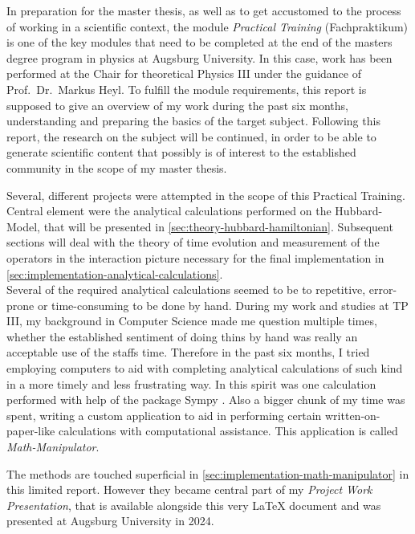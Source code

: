 In preparation for the master thesis, as well as to get accustomed to the process of working in a scientific context, the module \emph{Practical Training} (\glqq Fachpraktikum\grqq{}) is one of the key modules that need to be completed at the end of the masters degree program in physics at Augsburg University.
In this case, work has been performed at the Chair for theoretical Physics III under the guidance of  Prof.~Dr.~Markus Heyl.
To fulfill the module requirements, this report is supposed to give an overview of my work during the past six months, understanding and preparing the basics of the target subject.
Following this report, the research on the subject will be continued, in order to be able to generate scientific content that possibly is of interest to the established community in the scope of my master thesis.

Several, different projects were attempted in the scope of this Practical Training. 
Central element were the analytical calculations performed on the Hubbard-Model, that will be presented in \autoref{sec:theory-hubbard-hamiltonian}.
Subsequent sections will deal with the theory of time evolution and measurement of the operators in the interaction picture necessary for the final implementation in \autoref{sec:implementation-analytical-calculations}.\\

Several of the required analytical calculations seemed to be to repetitive, error-prone or time-consuming to be done by hand. 
During my work and studies at TP III, my background in Computer Science made me question multiple times, whether the established sentiment of doing thins \glqq by hand\grqq{} was really an acceptable use of the staffs time.
Therefore in the past six months, I tried employing computers to aid with completing analytical calculations of such kind in a more timely and less frustrating way.
In this spirit was one calculation performed with help of the package Sympy \cite{sympyPackage}.
Also a bigger chunk of my time was spent, writing a custom application to aid in performing certain \glqq written-on-paper-like\grqq{} calculations with computational assistance. This application is called \emph{Math-Manipulator}.

The methods are touched superficial in \autoref{sec:implementation-math-manipulator} in this limited report. 
However they became central part of my \emph{Project Work Presentation}, that is available alongside this very LaTeX document \cite{selfDocument} and was presented at Augsburg University in 2024.
